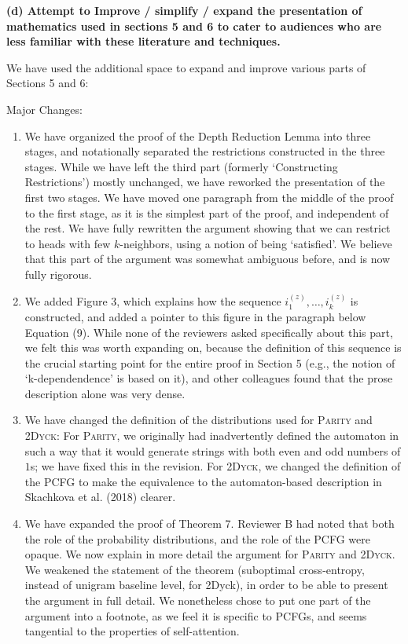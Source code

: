 \documentclass[11pt,a4paper]{article}
\newcounter{theorem}
\newcommand\response[1]{{\color{blue}#1}}
\newcommand\original[1]{\textbf{#1}}
\begin{document}
\original{(d) Attempt to Improve / simplify / expand the presentation of mathematics
used in sections 5 and 6 to cater to audiences who are less familiar with
these literature and techniques.}

\response{We have used the additional space to expand and improve various parts of Sections 5 and 6:}

\response{Major Changes:}
\begin{enumerate}
\item \response{We have organized the proof of the Depth Reduction Lemma into three stages, and notationally separated the restrictions constructed in the three stages. While we have left the third part (formerly `Constructing Restrictions') mostly unchanged, we have reworked the presentation of the first two stages. We have moved one paragraph from the middle of the proof to the first stage, as it is the simplest part of the proof, and independent of the rest. We have fully rewritten the argument showing that we can restrict to heads with few $k$-neighbors, using a notion of being `satisfied'. We believe that this part of the argument was somewhat ambiguous before, and is now fully rigorous.}

\item \response{We added Figure 3, which explains how the sequence $i^{(z)}_1, \dots, i^{(z)}_k$ is constructed, and added a pointer to this figure in the paragraph below Equation (9). While none of the reviewers asked specifically about this part, we felt this was worth expanding on, because the definition of this sequence is the crucial starting point for the entire proof in Section 5 (e.g., the notion of `k-dependendence' is based on it), and other colleagues found that the prose description alone was very dense.}

\item \response{We have changed the definition of the distributions used for \textsc{Parity} and \textsc{2Dyck}: For \textsc{Parity}, we originally had inadvertently defined the automaton in such a way that it would generate strings with both even and odd numbers of $1$s; we have fixed this in the revision. For \textsc{2Dyck}, we changed the definition of the PCFG to make the equivalence to the automaton-based description in Skachkova et al. (2018) clearer.}

\item \response{We have expanded the proof of Theorem 7. Reviewer B had noted that both the role of the probability distributions, and the role of the PCFG were opaque. We now explain in more detail the argument for \textsc{Parity} and \textsc{2Dyck}. We weakened the statement of the theorem (suboptimal cross-entropy, instead of unigram baseline level, for 2Dyck), in order to be able to present the argument in full detail. We nonetheless chose to put one part of the argument into a footnote, as we feel it is specific to PCFGs, and seems tangential to the properties of self-attention.}
\end{enumerate}
\end{document}
